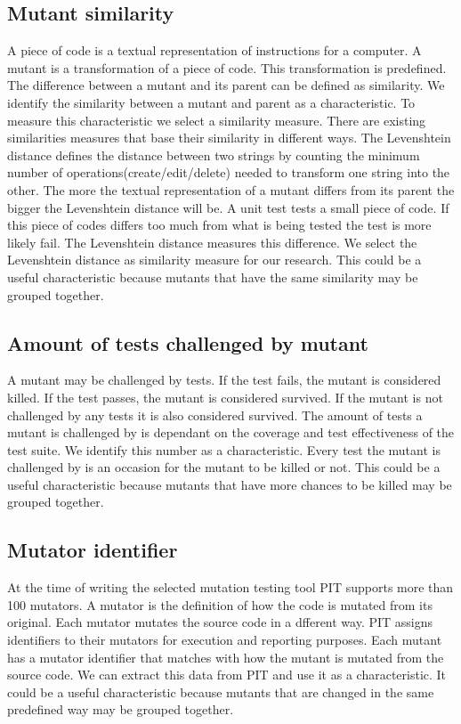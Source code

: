 \documentclass[../../main]{subfiles}
\begin{document}
\subsection{Mutant similarity}
A piece of code is a textual representation of instructions for a computer.
A mutant is a transformation of a piece of code.
This transformation is predefined.
The difference between a mutant and its parent can be defined as similarity.
We identify the similarity between a mutant and parent as a characteristic.
\newline
To measure this characteristic we select a similarity measure.
There are existing similarities measures that base their similarity in different ways\cite{Gomma2013AApproaches}. 
\newline
The Levenshtein distance defines the distance between two strings by counting the minimum number of operations(create/edit/delete) needed to transform one string into the other\cite{Gomma2013AApproaches}.
The more the textual representation of a mutant differs from its parent the bigger the Levenshtein distance will be.
A unit test tests a small piece of code.
If this piece of codes differs too much from what is being tested the test is more likely fail. 
The Levenshtein distance measures this difference.
We select the Levenshtein distance as similarity measure for our research\cite{Gomma2013AApproaches}.
This could be a useful characteristic because mutants that have the same similarity may be grouped together.

\subsection{Amount of tests challenged by mutant}
A mutant may be challenged by tests.
If the test fails, the mutant is considered killed.
If the test passes, the mutant is considered survived.
If the mutant is not challenged by any tests it is also considered survived.
The amount of tests a mutant is challenged by is dependant on the coverage and test effectiveness of the test suite.
We identify this number as a characteristic.
Every test the mutant is challenged by is an occasion for the mutant to be killed or not.
This could be a useful characteristic because mutants that have more chances to be killed may be grouped together.

\subsection{Mutator identifier}
At the time of writing the selected mutation testing tool PIT supports more than 100 mutators\cite{pitestMutators}.
A mutator is the definition of how the code is mutated from its original\cite{Offutt2001}.
Each mutator mutates the source code in a dfferent way.
PIT assigns identifiers to their mutators for execution and reporting purposes. 
Each mutant has a mutator identifier that matches with how the mutant is mutated from the source code.
We can extract this data from PIT and use it as a characteristic.
It could be a useful characteristic because mutants that are changed in the same predefined way may be grouped together.
\end{document}

